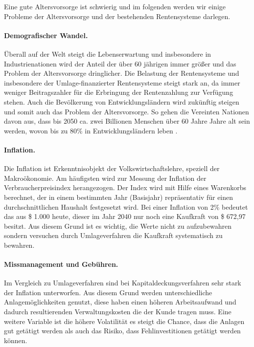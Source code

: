 Eine gute Altersvorsorge ist schwierig und im folgenden werden wir einige Probleme der Altersvorsorge und der bestehenden Rentensysteme darlegen.

\paragraph{Demografischer Wandel.} Überall auf der Welt steigt die Lebenserwartung und insbesondere in Industrienationen wird der Anteil der über 60 jährigen immer größer und das Problem der Altersvorsorge dringlicher. Die Belastung der Rentensysteme und insbesondere der Umlage-finanzierter Rentensysteme steigt stark an, da immer weniger Beitragszahler für die Erbringung der Rentenzahlung zur Verfügung stehen. Auch die Bevölkerung von Entwicklungsländern wird zukünftig steigen und somit auch das Problem der Altersvorsorge. So gehen die Vereinten Nationen davon aus, dass bis 2050 ca. zwei Billionen Menschen über 60 Jahre Jahre alt sein werden, wovon bis zu 80\% in Entwicklungsländern leben \cite{noauthor_pensions_2009}.



\paragraph{Inflation.}  Die Inflation ist Erkenntnisobjekt der Volkswirtschaftslehre, speziell der Makroökonomie. Am häufigsten wird zur Messung der Inflation der Verbraucherpreisindex herangezogen. Der Index wird mit Hilfe eines Warenkorbs berechnet, der in einem bestimmten Jahr (Basisjahr) repräsentativ für einen durchschnittlichen Haushalt festgesetzt wird. 
Bei einer Inflation von 2\% bedeutet das aus \$ 1.000 heute, dieser im Jahr 2040 nur noch eine Kaufkraft von \$ 672,97 besitzt. 
Aus diesem Grund ist es wichtig, die Werte nicht zu aufzubewahren sondern versuchen durch Umlageverfahren die Kaufkraft systematisch zu bewahren.

\paragraph{Missmanagement und Gebühren.} Im Vergleich zu Umlageverfahren sind bei Kapitaldeckungsverfahren sehr stark der Inflation unterworfen. Aus diesem Grund werden unterschiedliche Anlagemöglichkeiten genutzt, diese haben einen höheren Arbeitsaufwand und dadurch resultierenden Verwaltungskosten die der Kunde tragen muss. Eine weitere Variable ist die höhere Volatilität es steigt die Chance, dass die Anlagen gut getätigt werden als auch das Risiko, dass Fehlinvestitionen getätigt werden können.

